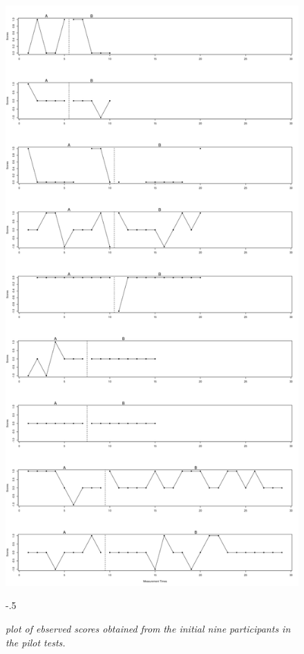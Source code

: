 \documentclass[empirical,issue, twocolumn,authordate]{jote-new-article}
\begin{document}
\begin{figure}[t!]
\captionsetup{width=\dimexpr \linewidth+\fullwidthlen\relax}
\begin{fullwidth}
\includegraphics[width=\linewidth]{media/Other,+Figure+3.png}
\end{fullwidth}
\begin{adjustwidth}{-.5\fullwidthlen}{}
\caption{\emph{plot of ebserved scores obtained }\emph{from}\emph{ the initial nine participants in the pilot tests.}}
\label{fig:fig3}
\end{adjustwidth}
\end{figure}
\end{document}
